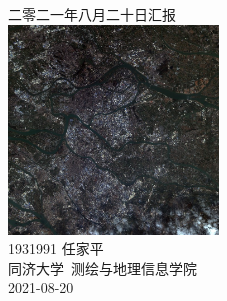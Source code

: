 \documentclass[a4paper, 12pt]{article}
\begin{document}
\begin{center}
    {\Huge 
        二零二一年八月二十日汇报}\\[20pt]
    
    \includegraphics[height=15em]{pic/cover.jpg} \\[15pt] 

    {\Large 
        1931991 任家平\\[12pt]
        同济大学~测绘与地理信息学院\\[12pt]
        2021-08-20}
\end{center}
\thispagestyle{empty}



\newpage
{}
\tableofcontents
\newpage
{}


% 

\listoffigures
{}
\listoftables
{}
\newpage
\nocite{*}


\end{document}
